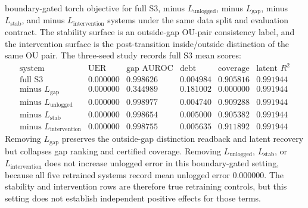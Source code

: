 boundary-gated torch objective for full S3, minus
$L_{\mathrm{unlogged}}$, minus $L_{\mathrm{gap}}$, minus
$L_{\mathrm{stab}}$, and minus $L_{\mathrm{intervention}}$ systems under the same
data split and evaluation contract.  The stability surface is an outside-gap
OU-pair consistency label, and the intervention surface is the post-transition
inside/outside distinction of the same OU pair.  The three-seed study records full S3
mean scores:
$$
\begin{array}{lccccc}
\text{system} & \text{UER} & \text{gap AUROC} & \text{debt} &
\text{coverage} & \text{latent }R^2\\
\text{full S3} & 0.000000 & 0.998626 & 0.004984 & 0.905816 & 0.991944\\
\text{minus }L_{\mathrm{gap}} & 0.000000 & 0.344989 & 0.181002 & 0.000000 & 0.991944\\
\text{minus }L_{\mathrm{unlogged}} & 0.000000 & 0.998977 & 0.004740 & 0.909288 & 0.991944\\
\text{minus }L_{\mathrm{stab}} & 0.000000 & 0.998654 & 0.005000 & 0.905382 & 0.991944\\
\text{minus }L_{\mathrm{intervention}} & 0.000000 & 0.998755 & 0.005635 & 0.911892 & 0.991944
\end{array}
$$
Removing $L_{\mathrm{gap}}$ preserves the outside-gap distinction readback and
latent recovery but collapses gap ranking and certified coverage.  Removing
$L_{\mathrm{unlogged}}$, $L_{\mathrm{stab}}$, or
$L_{\mathrm{intervention}}$ does not increase unlogged error in this
boundary-gated setting, because all five retrained systems record mean
unlogged error $0.000000$.  The stability and intervention rows are therefore
true retraining controls, but this setting does not establish independent
positive effects for those terms.

